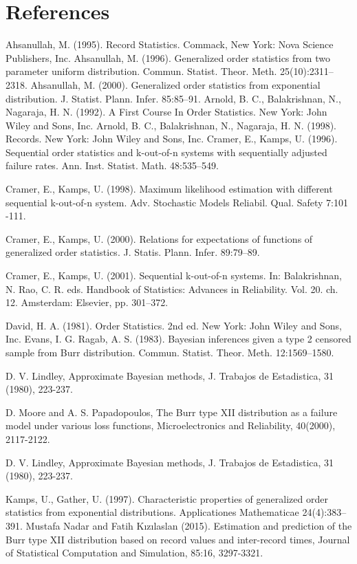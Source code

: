 \documentclass[a4paper, 11pt]{article}
\numberwithin{equation}{section}
\begin{document}
\section{References}
\begin{thebibliography}{99}
\bibitem{}Ahsanullah, M. (1995). Record Statistics. Commack, New York: Nova Science Publishers, Inc.
\bibitem{}Ahsanullah, M. (1996). Generalized order statistics from two parameter uniform distribution. Commun. Statist. Theor. Meth. 25(10):2311–2318.
\bibitem{} Ahsanullah, M. (2000). Generalized order statistics from exponential distribution. J. Statist. Plann. Infer. 85:85–91.
\bibitem{}Arnold, B. C., Balakrishnan, N., Nagaraja, H. N. (1992). A First Course In Order Statistics. New York: John Wiley and Sons, Inc.
\bibitem{}Arnold, B. C., Balakrishnan, N., Nagaraja, H. N. (1998). Records. New York: John Wiley and Sons, Inc.
\bibitem{}Cramer, E., Kamps, U. (1996). Sequential order statistics and k-out-of-n systems with sequentially adjusted failure rates. Ann. Inst. Statist. Math. 48:535–549.

\bibitem{}Cramer, E., Kamps, U. (1998). Maximum likelihood estimation with different sequential k-out-of-n system. Adv. Stochastic Models Reliabil. Qual. Safety 7:101 -111.

\bibitem{}Cramer, E., Kamps, U. (2000). Relations for expectations of functions of generalized order statistics. J. Statis. Plann. Infer. 89:79–89.

\bibitem{}Cramer, E., Kamps, U. (2001). Sequential k-out-of-n systems. In: Balakrishnan, N. Rao, C. R. eds. Handbook of Statistics: Advances in Reliability. Vol. 20. ch. 12. Amsterdam: Elsevier, pp. 301–372.

\bibitem{}David, H. A. (1981). Order Statistics. 2nd ed. New York: John Wiley and Sons, Inc. Evans, I. G. Ragab, A. S. (1983). Bayesian inferences given a type 2 censored sample from Burr distribution. Commun. Statist. Theor. Meth. 12:1569–1580.

\bibitem{}D. V. Lindley, Approximate Bayesian methods, J. Trabajos de Estadistica, 31 (1980),
223-237.

\bibitem{} D. Moore and A. S. Papadopoulos, The Burr type XII distribution as a failure model under various loss functions, Microelectronics and Reliability, 40(2000), 2117-2122.

\bibitem{}D. V. Lindley, Approximate Bayesian methods, J. Trabajos de Estadistica, 31 (1980), 223-237.

\bibitem{}Kamps, U., Gather, U. (1997). Characteristic properties of generalized order statistics from exponential distributions. Applicationes Mathematicae 24(4):383–391.
\bibitem{}Mustafa Nadar and Fatih Kızılaslan (2015). Estimation and prediction of the Burr type XII distribution based on record values and inter-record times, Journal of Statistical Computation and Simulation, 85:16, 3297-3321.


\end{thebibliography}
\end{document}
